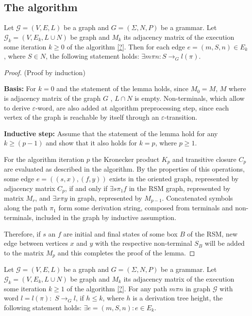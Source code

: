 \subsection{The algorithm}

\begin{lemma}
    \label{lemma:algo:correctness}
    Let $\mathcal{G} = (V,E,L)$ be a graph and $G = (\Sigma, N, P)$ be a grammar.
    Let $\mathcal{G}_k = (V,E_k,L \cup N)$ be graph and $M_k$ its adjacency
    matrix of the execution some iteration $k \geq 0$ of the algorithm \ref{?}.
    Then for each edge $e = (m,S,n) \in E_k$, where $S \in N$,
    the following statement holds: $\exists m\pi n: S \to_{G} l(\pi)$.
\end{lemma}

\begin{proof}{(Proof by induction)}

    \textbf{Basis:} For $k = 0$ and the statement of the lemma holds, since
    $M_0 = M$, $M$ where is adjacency matrix of the graph $G$ , $L \cap N$
    is empty. Non-terminals, which allow to derive $\varepsilon$-word, are 
    also added at algorithm preprocessing step, since each vertex of the graph is
    reachable by itself through an $\varepsilon$-transition.
    
    \textbf{Inductive step:} Assume that the statement of the lemma hold for any
    $k \geq (p - 1)$ and show that it also holds for $k = p$, where $p \geq 1$.
    
    For the algorithm iteration $p$ the Kronecker product $K_p$ and transitive
    closure $C_p$ are evaluated as described in the algorithm. By the properties
    of this operations, some edge $e = ((s,x),(f,y))$ exists in the oriented
    graph, represented by adjacency matrix $C_p$, if and only if $\exists s
    \pi_1 f$ in the RSM graph, represented by matrix $M_r$, and $\exists x \pi y$
    in graph, represented by $M_{p-1}$. Concatenated symbols along the path
    $\pi_1$ form some derivation string, composed from terminals and
    non-terminals, included in the graph by inductive assumption. 
    
    Therefore, if $s$ an $f$ are initial and final states of some box $B$ of the
    RSM, new edge between vertices $x$ and $y$ with the respective non-terminal
    $S_B$ will be added to the matrix $M_p$ and this completes the proof of the
    lemma.
    
\end{proof}

\begin{lemma}
    \label{lemma:algo:completeness}
    Let $\mathcal{G} = (V,E,L)$ be a graph and  $G = (\Sigma, N, P)$ be a grammar. 
    Let $\mathcal{G}_k = (V,E_k,L \cup N)$ be graph and $M_k$ its adjacency
    matrix of the execution some iteration $k \geq 1$ of the algorithm \ref{?}. 
    For any path $m \pi n$ in graph $\mathcal{G}$ with word
    $l = l(\pi): $ $S \to_G l$, if $h \leq k$, where $h$ is a derivation 
    tree height, the following statement holds: $\exists e = (m,S,n): e \in E_k$.
\end{lemma}

